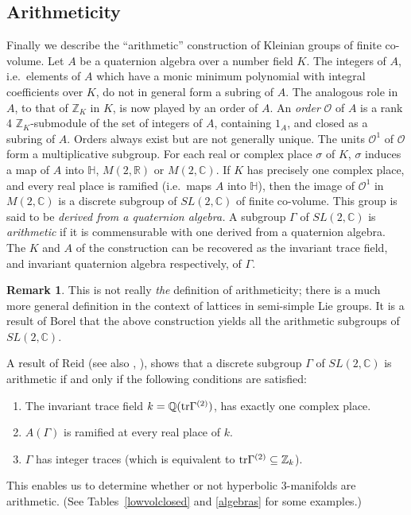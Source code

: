 \documentclass[a4paper]{amsart}
\def\H{{\mathbb H}}
\def\Z{{\mathbb Z}}
\def\Q{{\mathbb Q}}
\def\R{{\mathbb R}}
\def\C{{\mathbb C}}
\def\cal{\mathcal}
\def\O{{\cal O}}
\def\tr{\mbox{\rm tr}}
\theoremstyle{definition}
\newtheorem{remark}[theorem]{Remark}
\begin{document}
\subsection{Arithmeticity}
Finally we describe the ``arithmetic'' construction of Kleinian groups
of finite co-volume. Let $A$ be a quaternion algebra over a number
field $K$. The integers of $A$, i.e.\ elements of $A$ which have
a monic
minimum polynomial with integral coefficients over $K$, do not in
general form a subring of $A$. The analogous role in $A$, to that of
$\Z_K$ in $K$, is now played by an order of $A$. An {\em order} $\O$
of $A$ is a rank 4 $\Z_K$-submodule of the set of 
integers of $A$, containing $1_A$, and
closed as a subring of $A$. Orders always
exist but are not generally unique. The units $\O^1$ of $\O$ form a
multiplicative subgroup. For each real or complex place
$\sigma$ of $K$, $\sigma$ induces a map of $A$ into $\H$, $M(2,\R)$ or
$M(2,\C)$. If $K$ has precisely one complex place, and every real
place is ramified (i.e.\ maps $A$ into $\H$), then the image of $\O^1$
in $M(2,\C)$ is a discrete subgroup of $SL(2,\C)$ of finite
co-volume. This group is said to be {\em derived
from a quaternion algebra.} A subgroup $\Gamma$ of $SL(2,\C)$ is {\em
arithmetic} if it is commensurable with one derived from a quaternion
algebra. The $K$ and $A$ of the construction can be recovered as the
invariant trace field, and invariant quaternion algebra respectively,
of $\Gamma$. 

\begin{remark}
This is not really {\em the} definition of arithmeticity; there
is a much more general definition in the context of lattices in
semi-simple Lie groups. It is a result of Borel that the above
construction yields all the arithmetic subgroups of $SL(2,\C)$. 
\end{remark}

A result of Reid \cite{reidphd} (see also \cite{tak}, \cite{hlm}), 
shows that a discrete subgroup $\Gamma$ of $SL(2,\C)$ is
arithmetic if and only if the following conditions are satisfied:
\begin{enumerate}
\item The invariant trace field $k = \Q(\tr\Gamma^{(2)})$, has exactly
one complex place.
\item $A(\Gamma)$ is ramified at every real place of $k$.
\item $\Gamma$ has integer traces (which is equivalent to
$\tr\Gamma^{(2)} \subseteq \Z_k$).
\end{enumerate}
This enables us to determine 
whether or not hyperbolic 3-manifolds are arithmetic.
(See Tables~\ref{lowvolclosed} and \ref{algebras}
for some examples.)
\end{document}
